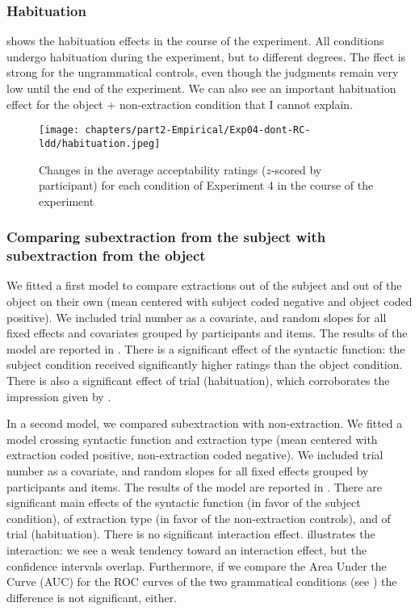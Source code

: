 \subsubsection{Habituation} 

 shows the habituation effects in the course of the experiment. All conditions undergo habituation during the experiment, but to different degrees. The ffect is strong for the ungrammatical controls, even though the judgments remain very low until the end of the experiment. We can also see an important habituation effect for the object + non-extraction condition that I cannot explain. 

\begin{figure}
    \centering
    \texttt{[image: chapters/part2-Empirical/Exp04-dont-RC-ldd/habituation.jpeg]}
    \caption{Changes in the average acceptability ratings ($z$-scored by participant) for each condition of Experiment 4 in the course of the experiment}
    \label{fig:exp04-habituation}
\end{figure}

\subsubsection{Comparing subextraction from the subject with subextraction from the object}

We fitted a first model to compare extractions out of the subject and out of the object on their own (mean centered with subject coded negative and object coded positive). We included trial number as a covariate, and random slopes for all fixed effects and covariates grouped by participants and items. The results of the model are reported in . 
There is a significant effect of the syntactic function: the subject condition received significantly higher ratings than the object condition. There is also a significant effect of trial (habituation), which corroborates the impression given by .



In a second model, we compared subextraction with non-extraction. We fitted a model crossing syntactic function and extraction type (mean centered with extraction coded positive, non-extraction coded negative). We included trial number as a covariate, and random slopes for all fixed effects grouped by participants and items. The results of the model are reported in .
There are significant main effects of the syntactic function (in favor of the subject condition), of extraction type (in favor of the non-extraction controls), and of trial (habituation). There is no significant interaction effect.  illustrates the interaction: we see a weak tendency toward an interaction effect, but the confidence intervals overlap. Furthermore, if we compare the Area Under the Curve (AUC) for the ROC curves of the two grammatical conditions (see ) the difference is not significant, either.

